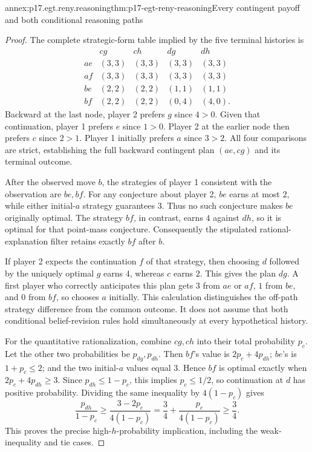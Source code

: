 \begin{annexitem}{annex:p17.egt.reny.reasoning}{thm:p17-egt-reny-reasoning}{Every contingent payoff and both conditional reasoning paths}
\begin{proof}
The complete strategic-form table implied by the five terminal
histories is
\[
\begin{array}{c|rrrr}
 &cg&ch&dg&dh\\\hline
 ae&(3,3)&(3,3)&(3,3)&(3,3)\\
 af&(3,3)&(3,3)&(3,3)&(3,3)\\
 be&(2,2)&(2,2)&(1,1)&(1,1)\\
 bf&(2,2)&(2,2)&(0,4)&(4,0).
\end{array}
\]
Backward at the last node, player 2 prefers \(g\) since \(4>0\).
Given that continuation, player 1 prefers \(e\) since \(1>0\).
Player 2 at the earlier node then prefers \(c\) since \(2>1\).
Player 1 initially prefers \(a\) since \(3>2\).
All four comparisons are strict, establishing the full
backward contingent plan \((ae,cg)\) and its terminal outcome.

After the observed move \(b\), the strategies of player 1
consistent with the observation are \(be,bf\).
For any conjecture about player 2, \(be\) earns at most \(2\),
while either initial-\(a\) strategy guarantees \(3\).
Thus no such conjecture makes \(be\) originally optimal.
The strategy \(bf\), in contrast, earns \(4\) against \(dh\),
so it is optimal for that point-mass conjecture.
Consequently the stipulated rational-explanation filter
retains exactly \(bf\) after \(b\).

If player 2 expects the continuation \(f\) of that strategy,
then choosing \(d\) followed by the uniquely optimal \(g\)
earns \(4\), whereas \(c\) earns \(2\).
This gives the plan \(dg\). A first player who correctly
anticipates this plan gets \(3\) from \(ae\) or \(af\),
\(1\) from \(be\), and \(0\) from \(bf\), so chooses
\(a\) initially. This calculation distinguishes the
off-path strategy difference from the common outcome.
It does not assume that both conditional belief-revision
rules hold simultaneously at every hypothetical history.

For the quantitative rationalization, combine \(cg,ch\)
into their total probability \(p_c\). Let the other two
probabilities be \(p_{dg},p_{dh}\). Then \(bf\)'s value is
\(2p_c+4p_{dh}\); \(be\)'s is \(1+p_c\leq2\); and the
two initial-\(a\) values equal \(3\).
Hence \(bf\) is optimal exactly when
\(2p_c+4p_{dh}\geq3\).
Since \(p_{dh}\leq1-p_c\), this implies \(p_c\leq1/2\),
so continuation at \(d\) has positive probability.
Dividing the same inequality by \(4(1-p_c)\) gives
\[
 \frac{p_{dh}}{1-p_c}
 \geq\frac{3-2p_c}{4(1-p_c)}
 =\frac34+\frac{p_c}{4(1-p_c)}
 \geq\frac34 .
\]
This proves the precise high-\(h\)-probability implication,
including the weak-inequality and tie cases.
\end{proof}
\end{annexitem}
